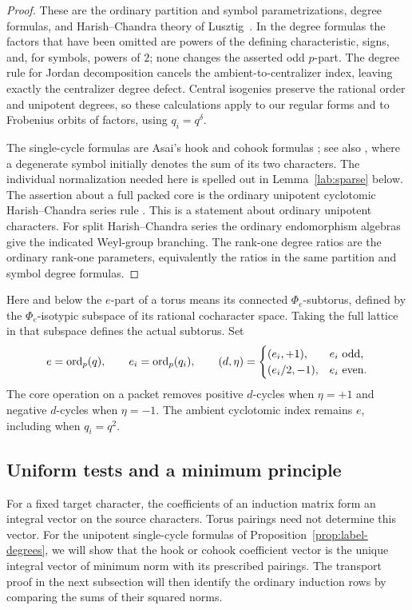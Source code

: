 \begin{proof}
These are the ordinary partition and symbol parametrizations, degree
formulas, and Harish--Chandra theory of
Lusztig~\cite{LusztigCharacters}.  In the degree formulas the factors
that have been omitted are powers of the defining characteristic,
signs, and, for symbols, powers of $2$; none changes the asserted
odd $p$-part.  The degree rule for Jordan decomposition cancels the
ambient-to-centralizer index, leaving exactly the centralizer degree
defect.  Central isogenies preserve the rational order and unipotent
degrees, so these calculations apply to our regular forms and to
Frobenius orbits of factors, using $q_i=q^\delta$.

The single-cycle formulas are Asai's hook and cohook formulas
\cite{Asai}; see also \cite[Theorem~3.2]{LubeckMalle}, where a
degenerate symbol initially denotes the sum of its two characters.
The individual normalization needed here is spelled out in
Lemma~\ref{lab:sparse} below.  The assertion about a full packed core
is the ordinary unipotent cyclotomic Harish--Chandra series rule
\cite[Theorem~3.2 and Section~3.A]{BMM}.
This is a statement about ordinary unipotent characters.
For split Harish--Chandra series the ordinary endomorphism algebras
give the indicated Weyl-group branching.  The rank-one degree
ratios are the ordinary rank-one parameters, equivalently the
ratios in the same partition and symbol degree formulas.
\end{proof}

Here and below the $e$-part of a torus means its connected
$\Phi_e$-subtorus, defined by the $\Phi_e$-isotypic subspace of its
rational cocharacter space.  Taking the full lattice in that subspace
defines the actual subtorus.  Set
\[
 e=\operatorname{ord}_p(q),\qquad e_i=\operatorname{ord}_p(q_i),\qquad
 (d,\eta)=
 \begin{cases}
  (e_i,+1),&e_i\text{ odd},\\
  (e_i/2,-1),&e_i\text{ even}.
 \end{cases}
\]
The core operation on a packet removes positive $d$-cycles when
$\eta=+1$ and negative $d$-cycles when $\eta=-1$.
The ambient cyclotomic index remains $e$, including when
$q_i=q^2$.

\subsection{Uniform tests and a minimum principle}

For a fixed target character, the coefficients of an induction matrix
form an integral vector on the source characters.  Torus pairings
need not determine this vector.  For the unipotent single-cycle
formulas of Proposition~\ref{prop:label-degrees}, we will show that
the hook or cohook coefficient vector is the unique integral vector
of minimum norm with its prescribed pairings.  The transport proof
in the next subsection will then identify the ordinary induction
rows by comparing the sums of their squared norms.

